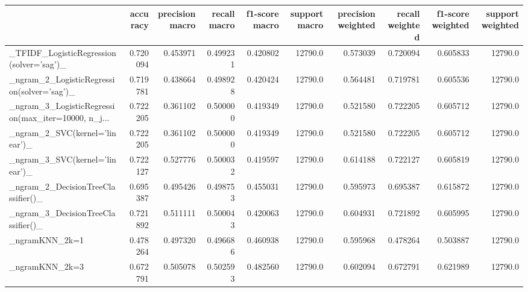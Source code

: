 \begin{tabular}{lrrrrrrrrr}
\toprule
{} &  accuracy &  precision macro &  recall macro &  f1-score macro &  support macro &  precision weighted &  recall weighted &  f1-score weighted &  support weighted \\
\midrule
\_TFIDF\_LogisticRegression(solver='sag')\_           &  0.720094 &         0.453971 &      0.499231 &        0.420802 &        12790.0 &            0.573039 &         0.720094 &           0.605833 &           12790.0 \\
\_ngram\_2\_LogisticRegression(solver='sag')\_         &  0.719781 &         0.438664 &      0.498928 &        0.420424 &        12790.0 &            0.564481 &         0.719781 &           0.605536 &           12790.0 \\
\_ngram\_3\_LogisticRegression(max\_iter=10000, n\_j... &  0.722205 &         0.361102 &      0.500000 &        0.419349 &        12790.0 &            0.521580 &         0.722205 &           0.605712 &           12790.0 \\
\_ngram\_2\_SVC(kernel='linear')\_                     &  0.722205 &         0.361102 &      0.500000 &        0.419349 &        12790.0 &            0.521580 &         0.722205 &           0.605712 &           12790.0 \\
\_ngram\_3\_SVC(kernel='linear')\_                     &  0.722127 &         0.527776 &      0.500032 &        0.419597 &        12790.0 &            0.614188 &         0.722127 &           0.605819 &           12790.0 \\
\_ngram\_2\_DecisionTreeClassifier()\_                 &  0.695387 &         0.495426 &      0.498753 &        0.455031 &        12790.0 &            0.595973 &         0.695387 &           0.615872 &           12790.0 \\
\_ngram\_3\_DecisionTreeClassifier()\_                 &  0.721892 &         0.511111 &      0.500043 &        0.420063 &        12790.0 &            0.604931 &         0.721892 &           0.605995 &           12790.0 \\
\_ngramKNN\_2k=1                                     &  0.478264 &         0.497320 &      0.496686 &        0.460938 &        12790.0 &            0.595968 &         0.478264 &           0.503887 &           12790.0 \\
\_ngramKNN\_2k=3                                     &  0.672791 &         0.505078 &      0.502593 &        0.482560 &        12790.0 &            0.602094 &         0.672791 &           0.621989 &           12790.0 \\

\end{tabular}

